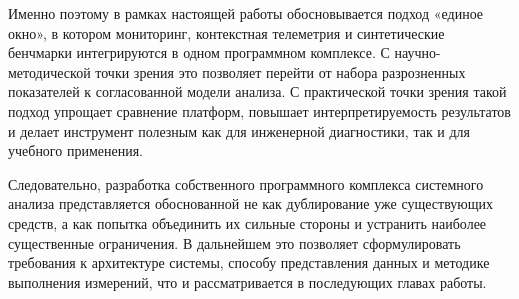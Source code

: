 Именно поэтому в рамках настоящей работы обосновывается подход «единое окно», в котором мониторинг, контекстная телеметрия и синтетические бенчмарки интегрируются в одном программном комплексе. С научно-методической точки зрения это позволяет перейти от набора разрозненных показателей к согласованной модели анализа. С практической точки зрения такой подход упрощает сравнение платформ, повышает интерпретируемость результатов и делает инструмент полезным как для инженерной диагностики, так и для учебного применения.

Следовательно, разработка собственного программного комплекса системного анализа представляется обоснованной не как дублирование уже существующих средств, а как попытка объединить их сильные стороны и устранить наиболее существенные ограничения. В дальнейшем это позволяет сформулировать требования к архитектуре системы, способу представления данных и методике выполнения измерений, что и рассматривается в последующих главах работы.
